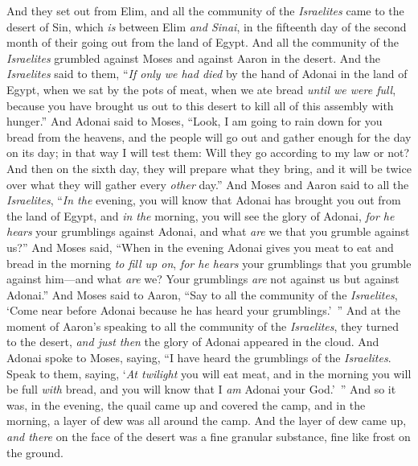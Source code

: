 \begin{biblechapter} %
 And they set out from Elim, and all the community of the \textit{Israelites} came to the desert of Sin, which \textit{is} between Elim \textit{and Sinai}, in the fifteenth day of the second month of their going out from the land of Egypt.
\verse And all the community of the \textit{Israelites} grumbled against Moses and against Aaron in the desert.
\verse And the \textit{Israelites} said to them, “\textit{If only we had died} by the hand of Adonai in the land of Egypt, when we sat by the pots of meat, when we ate bread \textit{until we were full}, because you have brought us out to this desert to kill all of this assembly with hunger.”
\verse And Adonai said to Moses, “Look, I am going to rain down for you bread from the heavens, and the people will go out and gather enough for the day on its day; in that way I will test them: Will they go according to my law or not?
\verse And then on the sixth day, they will prepare what they bring, and it will be twice over what they will gather every \textit{other} day.”
\verse And Moses and Aaron said to all the \textit{Israelites}, “\textit{In the} evening, you will know that Adonai has brought you out from the land of Egypt,
\verse and \textit{in the} morning, you will see the glory of Adonai, \textit{for he hears} your grumblings against Adonai, and what \textit{are} we that you grumble against us?”
\verse And Moses said, “When in the evening Adonai gives you meat to eat and bread in the morning \textit{to fill up on}, \textit{for he hears} your grumblings that you grumble against him—and what \textit{are} we? Your grumblings \textit{are} not against us but against Adonai.”
\verse And Moses said to Aaron, “Say to all the community of the \textit{Israelites}, ‘Come near before Adonai because he has heard your grumblings.’ ”
\verse And at the moment of Aaron’s speaking to all the community of the \textit{Israelites}, they turned to the desert, \textit{and just then} the glory of Adonai appeared in the cloud.
\verse And Adonai spoke to Moses, saying,
\verse “I have heard the grumblings of the \textit{Israelites}. Speak to them, saying, ‘\textit{At twilight} you will eat meat, and in the morning you will be full \textit{with} bread, and you will know that I \textit{am} Adonai your God.’ ”
\verse And so it was, in the evening, the quail came up and covered the camp, and in the morning, a layer of dew was all around the camp.
\verse And the layer of dew came up, \textit{and there} on the face of the desert was a fine granular substance, fine like frost on the ground.

\end{biblechapter}
